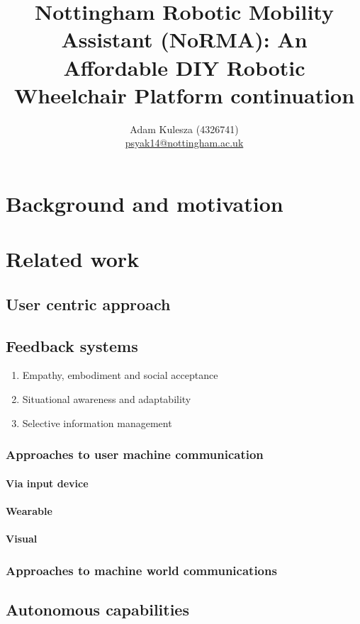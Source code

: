 \documentclass{article}
\title{Nottingham Robotic Mobility Assistant (NoRMA): An Affordable DIY Robotic Wheelchair Platform continuation}
\author{Adam Kulesza (4326741) \\ \href{mailto:psyak14@nottingham.ac.uk}{psyak14@nottingham.ac.uk}}
\begin{document}
\maketitle

\section{Background and motivation}
\par


\section{Related work}


\subsection{User centric approach}

\subsection{Feedback systems}
\begin{enumerate}
  \item Empathy, embodiment and social acceptance
  \item Situational awareness and adaptability
  \item Selective information management
\end{enumerate}
\subsubsection{Approaches to user machine communication}
\paragraph{Via input device}
\paragraph{Wearable}
\paragraph{Visual}
\subsubsection{Approaches to machine world communications}


\subsection{Autonomous capabilities}
\end{document}
